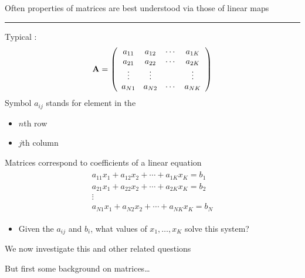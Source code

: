 \documentclass[letterpaper,10pt,english]{jupyterBook}
\begin{document}
\sphinxAtStartPar
Often properties of matrices are best understood via those of linear maps


\bigskip\hrule\bigskip


\sphinxAtStartPar
Typical :
\begin{equation*}
\begin{split}
%
{\bf A} = 
\left(
\begin{array}{cccc}
a_{11} & a_{12} & \cdots & a_{1K} \\
a_{21} & a_{22} & \cdots & a_{2K} \\
\vdots & \vdots & & \vdots \\
a_{N1} & a_{N2} & \cdots & a_{NK} 
\end{array}
\right)
%
\end{split}
\end{equation*}
\sphinxAtStartPar
Symbol \(a_{ij}\) stands for element in the
\begin{itemize}
\item {} 
\sphinxAtStartPar
\(n\)\sphinxhyphen{}th row

\item {} 
\sphinxAtStartPar
\(j\)\sphinxhyphen{}th column

\end{itemize}

\sphinxAtStartPar
Matrices correspond to coefficients of a linear equation
\begin{equation*}
\begin{split}
%
\begin{array}{c}
a_{11} x_1 + a_{12} x_2 + \cdots + a_{1K} x_K = b_1 \\
a_{21} x_1 + a_{22} x_2 + \cdots + a_{2K} x_K = b_2 \\
\vdots \\
a_{N1} x_1 + a_{N2} x_2 + \cdots + a_{NK} x_K = b_N 
\end{array}
%
\end{split}
\end{equation*}\begin{itemize}
\item {} 
\sphinxAtStartPar
Given the \(a_{ij}\) and \(b_i\), what values of \(x_1, \ldots, x_K\) solve this system?

\end{itemize}

\sphinxAtStartPar
We now investigate this and other related questions

\sphinxAtStartPar
But first some background on matrices…
\end{document}
